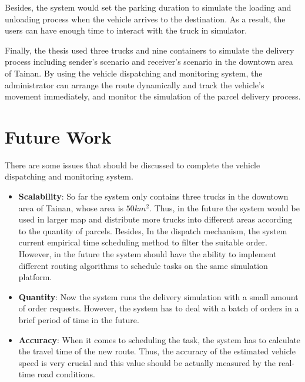 \documentclass[12pt]{ksthesis}
\begin{document}
\begin{thesis}
{Besides, the system would set the parking duration to simulate the loading and unloading process when the vehicle arrives to the destination. As a result, the users can have enough time to interact with the truck in simulator. 

Finally, the thesis used three trucks and nine containers to simulate the delivery process including sender’s scenario and receiver’s scenario in the downtown area of Tainan. By using the vehicle dispatching and monitoring system, the administrator can arrange the route dynamically and track the vehicle’s movement immediately, and monitor the simulation of the parcel delivery process.




\section{Future Work}

There are some issues that should be discussed to complete the vehicle dispatching and monitoring system.

\begin{itemize}


\item
\textbf{Scalability}: So far the system only contains three trucks in the downtown area of Tainan, whose area is $50km^{2}$. Thus, in the future the system would be used in larger map and distribute more trucks into different areas according to the quantity of parcels. Besides, In the dispatch mechanism, the system current empirical time scheduling method to filter the suitable order. However, in the future the system should have the ability to implement different routing algorithms to schedule tasks on the same simulation platform.

\item
\textbf{Quantity}: Now the system runs the delivery simulation with a small amount of order requests. However, the system has to deal with a batch of orders in a brief period of time in the future.

\item
\textbf{Accuracy}: When it comes to scheduling the task, the system has to calculate the travel time of the new route. Thus, the accuracy of the estimated vehicle speed is very crucial and this value should be actually measured by the real-time road conditions.

\end{itemize}

\cite{Fischer}
\cite{Jiang2018}


} \end{thesis}
\end{document}
